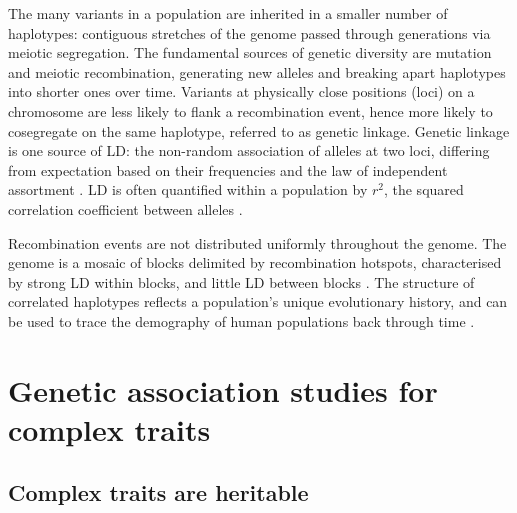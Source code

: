 \begin{outline}
\1 The many variants in a population are inherited in a smaller number of haplotypes: 
contiguous stretches of the genome passed through generations via meiotic segregation.
The fundamental sources of genetic diversity are mutation and meiotic recombination, generating new alleles and breaking apart haplotypes into shorter ones over time.
Variants at physically close positions (loci) on a chromosome are less likely to flank a recombination event, hence more likely to cosegregate on the same haplotype, referred to as genetic linkage.
Genetic linkage is one source of \gls{LD}: the non-random association of alleles at two loci, differing from expectation based on their frequencies and the law of independent assortment \autocite{slatkin2008LinkageDisequilibriumUnderstanding}.
\gls{LD} is often quantified within a population by $r^2$, the squared correlation coefficient between alleles \autocite{slatkin2008LinkageDisequilibriumUnderstanding}.

Recombination events are not distributed uniformly throughout the genome.
The genome is a mosaic of blocks delimited by recombination hotspots, 
characterised by strong \gls{LD} within blocks, and little \gls{LD} between blocks \autocite{wall2003HaplotypeBlocksLinkage,theinternationalhapmapconsortium2007SecondGenerationHuman}.
The structure of correlated haplotypes reflects a population's unique evolutionary history, and can be used to trace the demography of human populations back through time \autocite{karczewski2020AnalyticTranslationalGenetics}.


\section{Genetic association studies for complex traits}

\subsection{Complex traits are heritable}


\end{outline}
